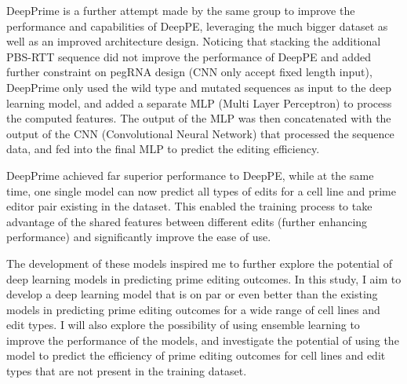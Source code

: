 DeepPrime is a further attempt made by the same group to improve the performance and capabilities of DeepPE, leveraging the much bigger dataset as well as an improved architecture design\cite{yuPredictionEfficienciesDiverse2023}.
Noticing that stacking the additional PBS-RTT sequence did not improve the performance of DeepPE and added further constraint on pegRNA design (CNN only accept fixed length input), DeepPrime only used the wild type and mutated sequences as input to the deep learning model, and added a separate MLP (Multi Layer Perceptron) to process the computed features. The output of the MLP was then concatenated with the output of the CNN (Convolutional Neural Network) that processed the sequence data, and fed into the final MLP to predict the editing efficiency. 

DeepPrime achieved far superior performance to DeepPE, while at the same time, one single model can now predict all types of edits for a cell line and prime editor pair existing in the dataset. This enabled the training process to take advantage of the shared features between different edits (further enhancing performance) and significantly improve the ease of use.





The development of these models inspired me to further explore the potential of deep learning models in predicting prime editing outcomes. In this study, I aim to develop a deep learning model that is on par or even better than the existing models in predicting prime editing outcomes for a wide range of cell lines and edit types. I will also explore the possibility of using ensemble learning to improve the performance of the models, and investigate the potential of using the model to predict the efficiency of prime editing outcomes for cell lines and edit types that are not present in the training dataset. 